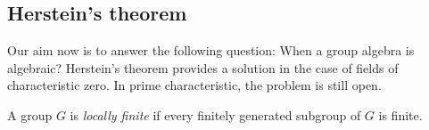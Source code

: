 
%
%
%


\subsection{Herstein's theorem}

Our aim now is to answer the following question: When
a group algebra is algebraic? Herstein's theorem provides
a solution in the case of fields of characteristic zero. In prime characteristic,
the problem is still open. 

\begin{definition}
	A group $G$ is \emph{locally finite} if every finitely generated 
	subgroup of $G$ is finite. 
\end{definition}

